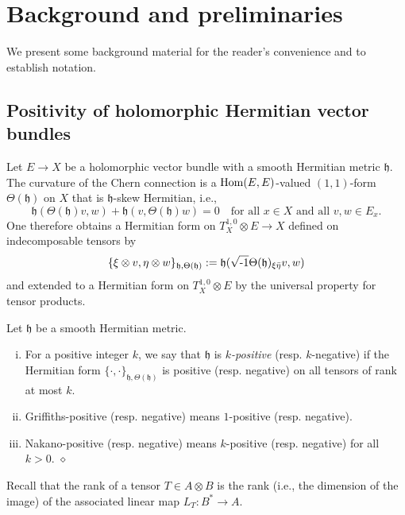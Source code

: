 \documentclass[12pt,hidelinks]{amsart}
\newcommand{\noi}{\noindent}
\newcommand{\fh}{{\mathfrak h}}
\newcommand{\red}{\hfill $\diamond$}
\newcommand{\ii}{\sqrt{\text{\rm -}1}}
\newcommand{\tensor}{\otimes}
\begin{document}
\section{Background and preliminaries}\label{background-section}

We present some background material for the reader's convenience and to establish notation.

\subsection{Positivity of holomorphic Hermitian vector bundles}\label{smooth-metrics-pos-par}

Let $E \to X$ be a holomorphic vector bundle with a smooth Hermitian metric $\fh$.  The curvature of the Chern connection is a ${\rm Hom}(E,E)$-valued $(1,1)$-form $\Theta (\fh)$ on $X$ that is $\fh$-skew Hermitian, i.e.,  
\[
\fh (\Theta(\fh)v,w) + \fh (v,\Theta(\fh)w) = 0 \quad \text{for all $x \in X$ and all $v, w \in E_x$}.
\]
One therefore obtains a Hermitian form on $T^{1,0} _X \tensor E \to X$ defined on indecomposable tensors by 
\[
\{ \xi \tensor v, \eta \tensor w\}_{\fh, \Theta (\fh)} := \fh (\ii \Theta (\fh)_{\xi \bar \eta} v,w)
\]
and extended to a Hermitian form on $T^{1,0} _X \tensor E$ by the universal property for tensor products.

\begin{defn}\label{pos-defn}
Let $\fh$ be a smooth Hermitian metric.
\begin{enumerate}[i.]
\item For a positive integer $k$, we say that $\fh$ is \emph{$k$-positive} (resp. $k$-negative) if the Hermitian form $\{ \cdot , \cdot \}_{\fh, \Theta (\fh)}$ is positive (resp. negative) on all tensors of rank at most $k$.
\item Griffiths-positive (resp. negative) means $1$-positive (resp. negative).
\item Nakano-positive (resp. negative) means $k$-positive (resp. negative) for all $k > 0$.
\red
\end{enumerate}
\end{defn}

\noi Recall that the rank of a tensor $T \in A \tensor B$ is the rank (i.e., the dimension of the image) of the associated linear map $L_T : B^* \to A$.
\end{document}
